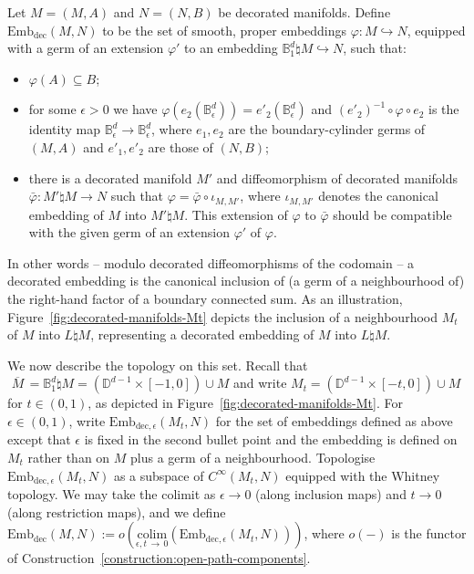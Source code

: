 \documentclass[AHL,Unicode,published]{cedram}
\newcommand{\colim}{\mathrm{colim}}
\newcommand{\rdec}{\mathrm{dec}}
\newcommand{\mbar}{\ensuremath{{\,\,\overline{\!\! M\!}\,}}}
\newcommand{\bB}{\mathbb{B}}
\newcommand{\bD}{\mathbb{D}}
\newcommand{\embdec}{\ensuremath{\mathrm{Emb}_{\rdec}}}
\newcommand{\embdece}{\ensuremath{\mathrm{Emb}_{\rdec,\epsilon}}}
\begin{document}
\begin{defi}\label{def:embdec}
Let $M = (M,A)$ and $N = (N,B)$ be decorated manifolds. Define $\embdec(M,N)$ to be the set of smooth, proper embeddings $\varphi \colon M \hookrightarrow N$, equipped with a germ of an extension $\varphi'$ to an embedding $\bB_{1}^d \natural M \hookrightarrow N$, such that:
\begin{itemize}
\item $\varphi(A) \subseteq B$;
\item for some $\epsilon > 0$ we have $\varphi(e_{2}(\bB_{\epsilon}^d)) = e'_{2}(\bB_{\epsilon}^d)$ and $(e'_{2})^{-1} \circ \varphi \circ e_{2}$ is the identity map $\bB_{\epsilon}^d \to \bB_{\epsilon}^d$, where $e_{1},e_{2}$ are the boundary-cylinder germs of $(M,A)$ and $e'_{1},e'_{2}$ are those of $(N,B)$;
\item there is a decorated manifold $M'$ and diffeomorphism of decorated manifolds $\bar{\varphi} \colon M' \natural M \to N$ such that $\varphi = \bar{\varphi} \circ \iota_{M,M'}$, where $\iota_{M,M'}$ denotes the canonical embedding of $M$ into $M' \natural M$. This extension of $\varphi$ to $\bar{\varphi}$ should be compatible with the given germ of an extension $\varphi'$ of $\varphi$.
\end{itemize}
In other words -- modulo decorated diffeomorphisms of the codomain -- a decorated embedding is the canonical inclusion of (a germ of a neighbourhood of) the right-hand factor of a boundary connected sum. As an illustration, Figure~\ref{fig:decorated-manifolds-Mt} depicts the inclusion of a neighbourhood $M_t$ of $M$ into $L\natural M$, representing a decorated embedding of $M$ into $L\natural M$.

We now describe the topology on this set. Recall that $\mbar = \bB^d_1 \natural M = (\bD^{d-1} \times [-1,0]) \cup M$ and write $M_t = (\bD^{d-1} \times [-t,0]) \cup M$ for $t \in (0,1)$, as depicted in Figure~\ref{fig:decorated-manifolds-Mt}. For $\epsilon \in (0,1)$, write $\embdece(M_t,N)$ for the set of embeddings defined as above except that $\epsilon$ is fixed in the second bullet point and the embedding is defined on $M_t$ rather than on $M$ plus a germ of a neighbourhood. Topologise $\embdece(M_t,N)$ as a subspace of $C^\infty(M_t,N)$ equipped with the Whitney topology. We may take the colimit as $\epsilon \to 0$ (along inclusion maps) and $t \to 0$ (along restriction maps), and we define $\embdec(M,N) := o(\underset{\epsilon,t\,\to\,0}{\colim}(\embdece(M_t,N)))$, where $o(-)$ is the functor of Construction~\ref{construction:open-path-components}.
\end{defi}
\end{document}

